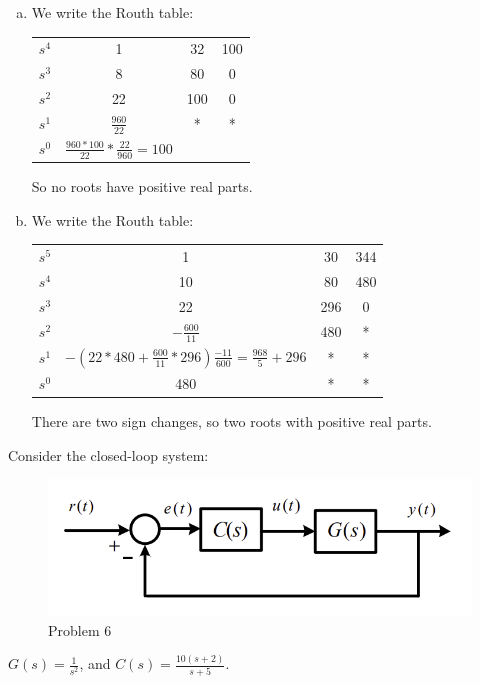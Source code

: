 \documentclass[11pt]{article}
\begin{document}
\soln

\begin{enumerate}[a)]
    \item We write the Routh table:
    \begin{center}
        \begin{tabular}{c|c c c}
            $s^4$ & 1 & 32 & 100\\
            $s^3$ & 8 & 80 & 0\\
            $s^2$ & 22 & 100 & 0\\
            $s^1$ & $\frac{960}{22}$ & * & *\\
            $s^0$ & $\frac{960*100}{22} * \frac{22}{960} = 100$
        \end{tabular}
    \end{center}
    So no roots have positive real parts. 

    \item We write the Routh table:
    \begin{center}
        \begin{tabular}{c|c c c}
            $s^5$ & 1 & 30 & 344\\
            $s^4$ & 10 & 80 & 480\\
            $s^3$ & 22 & 296 & 0\\
            $s^2$ & $-\frac{600}{11}$ & 480 & *\\
            $s^1$ & $-(22*480+\frac{600}{11}*296)\frac{-11}{600} = \frac{968}{5} + 296$ & * & *\\
            $s^0$ & 480 & * & *\\
        \end{tabular}
    \end{center}
    There are two sign changes, so two roots with positive real parts.
\end{enumerate}




Consider the closed-loop system:
\begin{figure}[h] 
    \centering
    \includegraphics[width=0.55 \linewidth]{prob6}
    \caption{Problem 6}
    \label{fig:p6}
\end{figure}

$G(s) = \frac{1}{s^2}$, and $C(s) = \frac{10(s+2)}{s+5}$.
\end{document}
